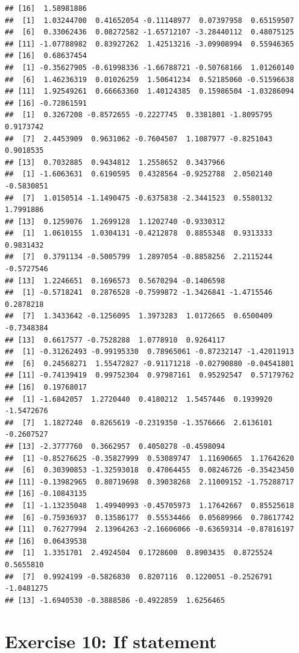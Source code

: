 \documentclass[]{book}
\begin{document}
\begin{verbatim}
## [16]  1.58981886
##  [1]  1.03244700  0.41652054 -0.11148977  0.07397958  0.65159507
##  [6]  0.33062436  0.08272582 -1.65712107 -3.28440112  0.48075125
## [11] -1.07788982  0.83927262  1.42513216 -3.09908994  0.55946365
## [16]  0.68637454
##  [1] -0.35627905 -0.61998336 -1.66788721 -0.50768166  1.01260140
##  [6]  1.46236319  0.01026259  1.50641234  0.52185060 -0.51596638
## [11]  1.92549261  0.66663360  1.40124385  0.15986504 -1.03286094
## [16] -0.72861591
##  [1]  0.3267208 -0.8572655 -0.2227745  0.3381801 -1.8095795  0.9173742
##  [7]  2.4453909  0.9631062 -0.7604507  1.1087977 -0.8251043  0.9018535
## [13]  0.7032885  0.9434812  1.2558652  0.3437966
##  [1] -1.6063631  0.6190595  0.4328564 -0.9252788  2.0502140 -0.5830851
##  [7]  1.0150514 -1.1490475 -0.6375838 -2.3441523  0.5580132  1.7991886
## [13]  0.1259076  1.2699128  1.1202740 -0.9330312
##  [1]  1.0610155  1.0304131 -0.4212878  0.8855348  0.9313333  0.9831432
##  [7]  0.3791134 -0.5005799  1.2897054 -0.8858256  2.2115244 -0.5727546
## [13]  1.2246651  0.1696573  0.5670294 -0.1406598
##  [1] -0.5718241  0.2876528 -0.7599872 -1.3426841 -1.4715546  0.2878218
##  [7]  1.3433642 -0.1256095  1.3973283  1.0172665  0.6500409 -0.7348384
## [13]  0.6617577 -0.7528288  1.0778910  0.9264117
##  [1] -0.31262493 -0.99195330  0.78965061 -0.87232147 -1.42011913
##  [6]  0.24568271  1.55472827 -0.91171218 -0.02790880 -0.04541801
## [11] -0.74139419  0.99752304  0.97987161  0.95292547  0.57179762
## [16]  0.19768017
##  [1] -1.6842057  1.2720440  0.4180212  1.5457446  0.1939920 -1.5472676
##  [7]  1.1827240  0.8265619 -0.2319350 -1.3576666  2.6136101 -0.2607527
## [13] -2.3777760  0.3662957  0.4050278 -0.4598094
##  [1] -0.85276625 -0.35827999  0.53089747  1.11690665  1.17642620
##  [6]  0.30390853 -1.32593018  0.47064455  0.08246726 -0.35423450
## [11] -0.13982965  0.80719698  0.39038268  2.11009152 -1.75288717
## [16] -0.10843135
##  [1] -1.13235048  1.49940993 -0.45705973  1.17642667  0.85525618
##  [6] -0.75936937  0.13586177  0.55534466  0.05689966  0.78617742
## [11]  0.76277994  2.13964263 -2.16606066 -0.63659314 -0.87816197
## [16]  0.06439538
##  [1]  1.3351701  2.4924504  0.1728600  0.8903435  0.8725524  0.5655810
##  [7]  0.9924199 -0.5826830  0.8207116  0.1220051 -0.2526791 -1.0481275
## [13] -1.6940530 -0.3888586 -0.4922859  1.6256465
\end{verbatim}

\hypertarget{exercise-10-if-statement}{%
\section{Exercise 10: If statement}\label{exercise-10-if-statement}}
\end{document}
